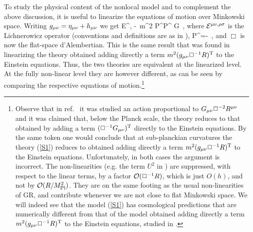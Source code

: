 \documentclass[aps,prd,twocolumn,superscriptaddress,nofootinbib]{revtex4}
\begin{document}
To study the physical content of the nonlocal model and to complement the above discussion, it is useful to  linearize the equations of motion  over Minkowski space. Writing $g_{\mu\nu}=\eta_{\mu\nu} +h_{\mu\nu}$  we get
\be\label{line1}
{\cal E}^{\mu\nu,\rho\sigma}\hrs
-\, m^2 P^{\mu\nu}P^{\rho\sigma}
\pi G\TMN\, ,
\ee
where  ${\cal E}^{\mu\nu,\rho\sigma}$  is the  Lichnerowicz operator  (conventions and definitions are as in \cite{Jaccard:2013gla}),
\be
P^{\mu\nu}=\eMN-\frac{\paM\paN}{\Box}\, ,
\ee
and $\Box$ is now  the   flat-space d'Alembertian. 
This is the same result that was found in \cite{Maggiore:2013mea} linearizing the theory obtained adding directly a term $m^2(g_{\mu\nu}\Box^{-1} R)^ {\rm T} $  to the Einstein equations. Thus, the two theories are equivalent at the linearized level. At the fully non-linear level they are however different, as can be seen by comparing the respective equations of motion.\footnote{Observe that in ref.~\cite{Modesto:2013jea} it was studied an action proportional to $G_{\mu\nu}\Box^{-2}R^{\mu\nu}$ and it was claimed that, below the Planck scale,  the theory reduces to that obtained by adding a term $(\Box^{-1}G_{\mu\nu})^{\rm T}$  directly to the Einstein equations. By the same token one would conclude that at sub-planckian curvatures the theory 
(\ref{S1}) reduces to obtained adding directly a term $m^2(g_{\mu\nu}\Box^{-1} R)^ {\rm T} $  to the Einstein equations. Unfortunately, in both cases the argument is incorrect. The non-linearities (e.g. the term $U^2$ in )
are suppressed, with respect to the linear terms,  by a factor ${\cal O}(\Box^{-1} R)$, which is just $O(h)$, and not by
${\cal O}(R/M_{\rm Pl}^2)$. They are on the same footing as the usual non-linearities of GR, and contribute whenever we are not close to flat Minkowski space. We will indeed see that the model (\ref{S1}) has cosmological predictions that are numerically different from that of the model obtained adding directly a term $m^2(g_{\mu\nu}\Box^{-1} R)^ {\rm T} $  to the Einstein equations,  studied in \cite{Maggiore:2013mea}.}
\end{document}
